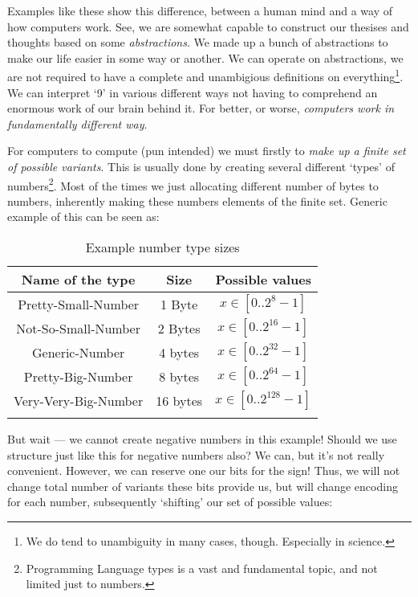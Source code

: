 \documentclass[../../what-is-computer.tex]{subfiles}
\begin{document}
    Examples like these show this difference, between a human mind and a way of how computers work. See, we are somewhat capable to construct our thesises and thoughts
    based on some \emph{abstractions}. We made up a bunch of abstractions to make our life easier in some way or another. We can operate on abstractions, we are not required
    to have a complete and unambigious definitions on everything\footnote{We do tend to unambiguity in many cases, though. Especially in science.}. We can interpret `9' in various
    different ways not having to comprehend an enormous work of our brain behind it. For better, or worse, \emph{computers work in fundamentally different way}.

    For computers to compute (pun intended) we must firstly to \emph{make up a finite set of possible variants}. This is usually done by creating several different
    `types' of numbers\footnote{Programming Language types is a vast and fundamental topic, and not limited just to numbers.}. Most of the times we just allocating 
    different number of bytes to numbers, inherently making these numbers elements of the finite set. Generic example of this can be seen as:

    \begin{table}[H]
        \centering
        \begin{longtable}{|c|c|c|}
            \hline
            Name of the type & Size & Possible values \\\hline
            Pretty-Small-Number & 1 Byte & $x \in [0..2^8 - 1]$ \\\hline
            Not-So-Small-Number & 2 Bytes & $x \in [0..2^{16} - 1]$\\\hline
            Generic-Number & 4 bytes & $x \in [0..2^{32} - 1]$\\\hline
            Pretty-Big-Number & 8 bytes & $x \in [0..2^{64} - 1]$\\\hline
            Very-Very-Big-Number & 16 bytes & $x \in [0..2^{128} - 1]$\\\hline
            \caption{Example number type sizes}

        \end{longtable}
    \end{table}

    But wait --- we cannot create negative numbers in this example! Should we use structure just like this for negative numbers also? We can, but it's not really convenient.
    However, we can reserve one our bits for the sign! Thus, we will not change total number of variants these bits provide us, but will change encoding for each number, subsequently
    `shifting' our set of possible values:
\end{document}
